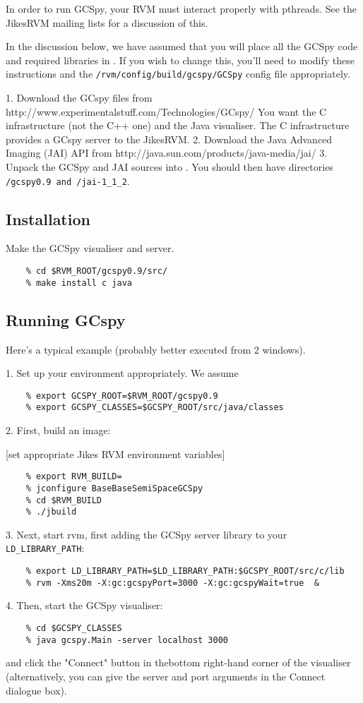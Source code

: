 In order to run GCSpy, your RVM must interact properly with pthreads. See the JikesRVM mailing lists for a discussion of this.

In the discussion below, we have assumed that you will place all the GCSpy code and required libraries in \rvmRoot. If you wish to change this, you'll need to modify these instructions and the {\tt \rvmRoot/rvm/config/build/gcspy/GCSpy} config file appropriately.

   1. Download the GCspy files from http://www.experimentalstuff.com/Technologies/GCspy/
      You want the C infrastructure (not the C++ one) and the Java visualiser. The C infrastructure provides a GCspy server to the JikesRVM.
   2. Download the Java Advanced Imaging (JAI) API from http://java.sun.com/products/java-media/jai/
   3. Unpack the GCSpy and JAI sources into \rvmRoot. You should then have directories {\tt \rvmRoot/gcspy0.9 and \rvmRoot/jai-1\_1\_2}. 



\subsection{Installation}

   Make the GCSpy visualiser and server.
\begin{verbatim}
    % cd $RVM_ROOT/gcspy0.9/src/
    % make install c java
\end{verbatim}



\subsection{Running GCspy}

Here's a typical example (probably better executed from 2 windows).

   1. Set up your environment appropriately. We assume
\begin{verbatim}
    % export GCSPY_ROOT=$RVM_ROOT/gcspy0.9
    % export GCSPY_CLASSES=$GCSPY_ROOT/src/java/classes
\end{verbatim}
   2. First, build an image:

    [set appropriate Jikes RVM environment variables]
\begin{verbatim}
    % export RVM_BUILD=
    % jconfigure BaseBaseSemiSpaceGCSpy
    % cd $RVM_BUILD
    % ./jbuild
\end{verbatim}
   3. Next, start rvm, first adding the GCSpy server library to your {\tt LD\_LIBRARY\_PATH}:
\begin{verbatim}
    % export LD_LIBRARY_PATH=$LD_LIBRARY_PATH:$GCSPY_ROOT/src/c/lib
    % rvm -Xms20m -X:gc:gcspyPort=3000 -X:gc:gcspyWait=true  &
\end{verbatim}
   4. Then, start the GCSpy visualiser:
\begin{verbatim}
    % cd $GCSPY_CLASSES
    % java gcspy.Main -server localhost 3000
\end{verbatim}
      and click the "Connect" button in thebottom right-hand corner of the visualiser (alternatively, you can give the server and port arguments in the Connect dialogue box). 


